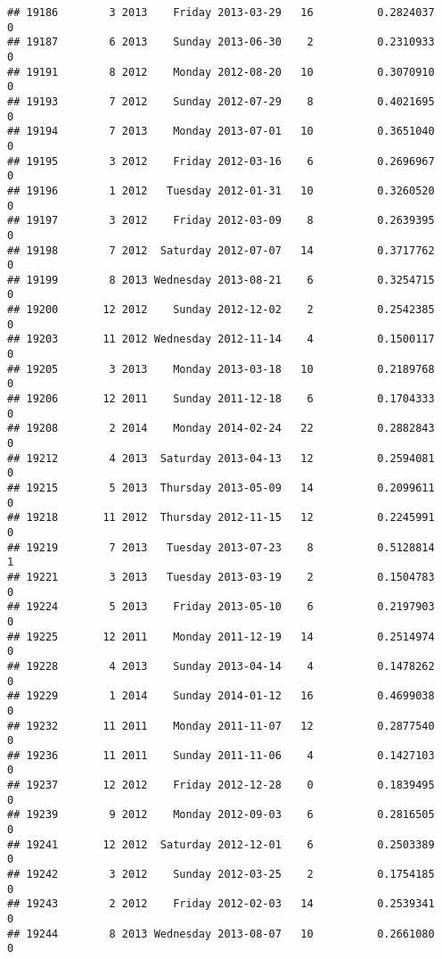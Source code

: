\documentclass[
]{article}
\begin{document}
\begin{verbatim}
## 19186        3 2013    Friday 2013-03-29   16          0.2824037             0
## 19187        6 2013    Sunday 2013-06-30    2          0.2310933             0
## 19191        8 2012    Monday 2012-08-20   10          0.3070910             0
## 19193        7 2012    Sunday 2012-07-29    8          0.4021695             0
## 19194        7 2013    Monday 2013-07-01   10          0.3651040             0
## 19195        3 2012    Friday 2012-03-16    6          0.2696967             0
## 19196        1 2012   Tuesday 2012-01-31   10          0.3260520             0
## 19197        3 2012    Friday 2012-03-09    8          0.2639395             0
## 19198        7 2012  Saturday 2012-07-07   14          0.3717762             0
## 19199        8 2013 Wednesday 2013-08-21    6          0.3254715             0
## 19200       12 2012    Sunday 2012-12-02    2          0.2542385             0
## 19203       11 2012 Wednesday 2012-11-14    4          0.1500117             0
## 19205        3 2013    Monday 2013-03-18   10          0.2189768             0
## 19206       12 2011    Sunday 2011-12-18    6          0.1704333             0
## 19208        2 2014    Monday 2014-02-24   22          0.2882843             0
## 19212        4 2013  Saturday 2013-04-13   12          0.2594081             0
## 19215        5 2013  Thursday 2013-05-09   14          0.2099611             0
## 19218       11 2012  Thursday 2012-11-15   12          0.2245991             0
## 19219        7 2013   Tuesday 2013-07-23    8          0.5128814             1
## 19221        3 2013   Tuesday 2013-03-19    2          0.1504783             0
## 19224        5 2013    Friday 2013-05-10    6          0.2197903             0
## 19225       12 2011    Monday 2011-12-19   14          0.2514974             0
## 19228        4 2013    Sunday 2013-04-14    4          0.1478262             0
## 19229        1 2014    Sunday 2014-01-12   16          0.4699038             0
## 19232       11 2011    Monday 2011-11-07   12          0.2877540             0
## 19236       11 2011    Sunday 2011-11-06    4          0.1427103             0
## 19237       12 2012    Friday 2012-12-28    0          0.1839495             0
## 19239        9 2012    Monday 2012-09-03    6          0.2816505             0
## 19241       12 2012  Saturday 2012-12-01    6          0.2503389             0
## 19242        3 2012    Sunday 2012-03-25    2          0.1754185             0
## 19243        2 2012    Friday 2012-02-03   14          0.2539341             0
## 19244        8 2013 Wednesday 2013-08-07   10          0.2661080             0

\end{verbatim}
\end{document}
